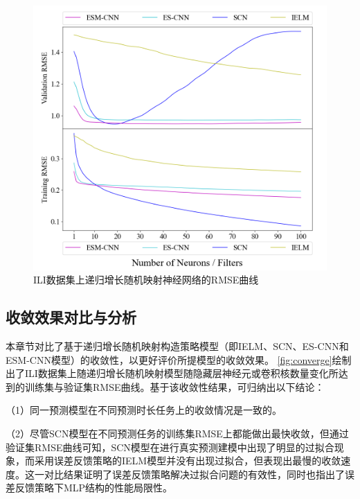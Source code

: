 \begin{figure}[!t]
\begin{minipage}[b]{0.43\textwidth}
    \end{minipage}
    \begin{minipage}[b]{0.43\textwidth}
        \includegraphics[width = \textwidth]{float/ch.cnn/sili_H8_revise.png}
    \end{minipage}

    \caption{\label{fig:converge} ILI数据集上递归增长随机映射神经网络的RMSE曲线}
\end{figure}


\subsection{收敛效果对比与分析}
本章节对比了基于递归增长随机映射构造策略模型（即IELM、SCN、ES-CNN和ESM-CNN模型）的收敛性，以更好评价所提模型的收敛效果。
\autoref{fig:converge}绘制出了ILI数据集上随递归增长随机映射模型随隐藏层神经元或卷积核数量变化所达到的训练集与验证集RMSE曲线。基于该收敛性结果，可归纳出以下结论：

（1）同一预测模型在不同预测时长任务上的收敛情况是一致的。

（2）尽管SCN模型在不同预测任务的训练集RMSE上都能做出最快收敛，但通过验证集RMSE曲线可知，SCN模型在进行真实预测建模中出现了明显的过拟合现象，而采用误差反馈策略的IELM模型并没有出现过拟合，但表现出最慢的收敛速度。这一对比结果证明了误差反馈策略解决过拟合问题的有效性，同时也指出了误差反馈策略下MLP结构的性能局限性。

